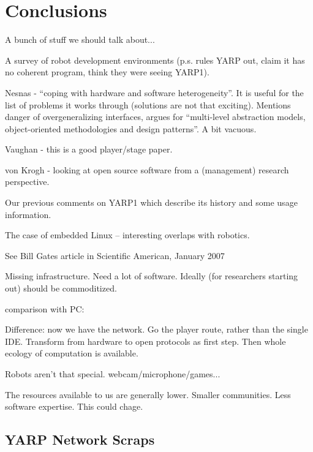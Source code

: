 
\section{Conclusions}

A bunch of stuff we should talk about...

A survey of robot development environments
\cite{kramer2007development} (p.s. rules YARP out, claim it has
no coherent program, think they were seeing YARP1).



Nesnas \cite{nesnas2006claraty} - ``coping with hardware and software 
heterogeneity''.  It is useful for the list of problems it
works through (solutions are not that exciting).
%
Mentions danger of overgeneralizing interfaces, argues for 
``multi-level abstraction models, object-oriented methodologies
and design patterns''.  A bit vacuous.

Vaughan \cite{vaughan2006reusable} - this is a good player/stage
paper.

von Krogh \cite{vonkrogh2006promise} - looking at open source
software from a (management) research perspective.

Our previous comments on YARP1 \cite{metta2006yarp} which
describe its history and some usage information.

The case of embedded Linux \cite{henkel2006selective} --
interesting overlaps with robotics.

See Bill Gates article in Scientific American, January 2007

Missing infrastructure.
Need a lot of software.
Ideally (for researchers starting out) should be commoditized.


comparison with PC:

Difference: now we have the network.  Go the player route, rather than
the single IDE.  Transform from hardware to open protocols as first
step.  Then whole ecology of computation is available.

Robots aren't that special.  webcam/microphone/games...

The resources available to us are generally lower.  Smaller communities.
Less software expertise.  This could chage.







\subsection{YARP Network Scraps}

